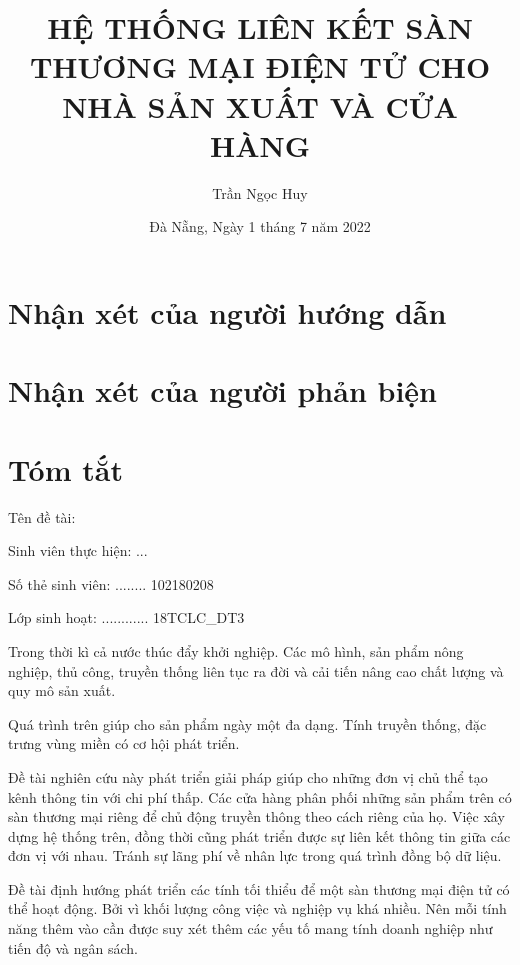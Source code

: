 \documentclass[11pt]{report}
\title{HỆ THỐNG LIÊN KẾT SÀN THƯƠNG MẠI ĐIỆN TỬ CHO NHÀ SẢN XUẤT VÀ CỬA HÀNG}
\author{Trần Ngọc Huy}
\date{Đà Nẵng, Ngày 1 tháng 7 năm 2022}
\newcommand{\msv}{102180208}
\newcommand{\myclass}{18TCLC\_DT3}
\begin{document}
\chapter*{Nhận xét của người hướng dẫn}
\pagebreak

\chapter*{Nhận xét của người phản biện}
\pagebreak



\chapter*{Tóm tắt}
\raggedright
\makeatletter




Tên đề tài: \@title

Sinh viên thực hiện: ...\@author \dotfill

Số thẻ sinh viên: ........ \msv \dotfill

Lớp sinh hoạt: ............ \myclass \dotfill


\vspace{0.5cm}
\justifying

Trong thời kì cả nước thúc đẩy khởi nghiệp. Các mô hình, sản phẩm nông nghiệp, thủ công, truyền thống liên tục ra đời và cải tiến nâng cao chất lượng và quy mô sản xuất.

Quá trình trên giúp cho sản phẩm ngày một đa dạng. Tính truyền thống, đặc trưng vùng miền có cơ hội phát triển.

Đề tài nghiên cứu này phát triển giải pháp giúp cho những đơn vị chủ thể tạo kênh thông tin với chi phí thấp. Các cửa hàng phân phối những sản phẩm trên có sàn thương mại riêng để chủ động truyền thông theo cách riêng của họ. Việc xây dựng hệ thống trên, đồng thời cũng phát triển được sự liên kết thông tin giữa các đơn vị với nhau. Tránh sự lãng phí về nhân lực trong quá trình đồng bộ dữ liệu.

Đề tài định hướng phát triển các tính tối thiểu để một sàn thương mại điện tử có thể hoạt động. Bởi vì khối lượng công việc và nghiệp vụ khá nhiều. Nên mỗi tính năng thêm vào cần được suy xét thêm các yếu tố mang tính doanh nghiệp như tiến độ và ngân sách.
\end{document}
